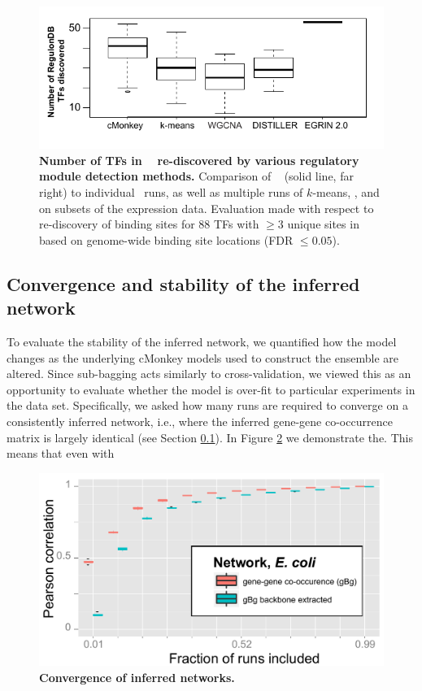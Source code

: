 \begin{figure}[h!]
\centering
\includegraphics[width=0.95\linewidth]{figures/ensemble_comparison_regDB.pdf}
\caption[Number of TFs in \rdb~ re-discovered by various
    regulatory module detection methods.]  {{\bf Number of TFs in
    \rdb~ re-discovered by various regulatory module detection
    methods.} Comparison of \egrine~ (solid line, far right) to
  individual \cm\ runs, as well as multiple runs of $k$-means,
  , and  on subsets of the expression
  data. Evaluation made with respect to re-discovery of binding sites
  for 88 TFs with $\geq 3$ unique sites in \rdb~ based on genome-wide
  binding site locations (FDR $\leq 0.05$).}
\label{fig:ensemble_comparison_regDB}
\end{figure}

\subsection{Convergence and stability of the inferred network}

To evaluate the stability of the inferred \egrine network, we
quantified how the model changes as the underlying cMonkey models used
to construct the ensemble are altered. Since sub-bagging acts
similarly to cross-validation, we viewed this as an opportunity to
evaluate whether the model is over-fit to particular experiments in
the data set. Specifically, we asked how many runs are required to
converge on a consistently inferred network, i.e., where the inferred
gene-gene co-occurrence matrix is largely identical (see Section
\ref{}). In Figure \ref{fig:gBg_network_converge} we demonstrate
the. This means that even with

\begin{figure}[h!]
\centering
\includegraphics[width=0.75\linewidth]{figures/gBg_network_converge.pdf}
\caption[Convergence of \egrine inferred networks.]  {{\bf Convergence of \egrine inferred networks.}} 
\label{fig:gBg_network_converge}
\end{figure}

